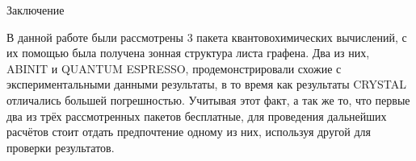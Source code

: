 \begin{center}
    Заключение
\end{center}

В данной работе были рассмотрены 3 пакета квантовохимических вычислений, с их помощью была получена зонная структура листа графена. Два из них, ABINIT и QUANTUM ESPRESSO, продемонстрировали схожие с экспериментальными данными результаты, в то время как результаты CRYSTAL отличались большей погрешностью. Учитывая этот факт, а так же то, что первые два из трёх рассмотренных пакетов бесплатные, для проведения дальнейших расчётов стоит отдать предпочтение одному из них, используя другой для проверки результатов.
